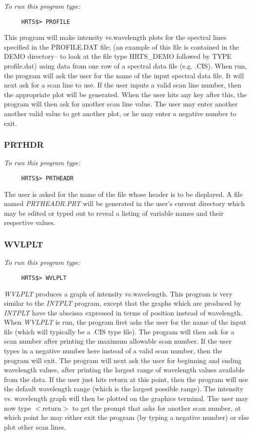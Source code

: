{\em To run this program type:}
\begin{verbatim}
     HRTS$> PROFILE
\end{verbatim}
  This program will make intensity vs.wavelength plots for the
  spectral lines specified in the  PROFILE.DAT file; (an example of
  this file is contained in the DEMO directory-- to look at the file type
  HRTS\_DEMO followed by TYPE profile.dat)
  using data from one row of a spectral data file (e.g. .CIS).  When
  run, the program will ask the user for the name of the input spectral
  data file.  It will next ask for a scan line to use.  If the user
  inputs a valid scan line number, then the appropriate plot will be
  generated.  When the user hits any key after this, the program will
  then ask for another scan line value.  The user may enter another
  another valid value to get another plot, or he may enter a negative
  number to exit.

\subsubsection{PRTHDR}

{\em To run this program type:}
\begin{verbatim}
     HRTS$> PRTHEADR
\end{verbatim}
  The user is asked for the name of the file whose header is to be
  displayed.  A file named {\em PRTHEADR.PRT} will be generated in the user's
  current directory which may be edited or typed out to reveal a listing
  of variable names and their respective values.

\subsubsection{WVLPLT}

{\em To run this program type:}
\begin{verbatim}
     HRTS$> WVLPLT
\end{verbatim}
{\em WVLPLT} produces a graph of intensity vs.wavelength.  This program
  is very similar to the {\em INTPLT} program, except that the graphs which are
  produced by {\em INTPLT} have the abscissa expressed in terms of position
  instead of wavelength.  When {\em WVLPLT} is run, the program first asks the
  user for the name of the input file (which will typically be a .CIS
  type file).   The program will then ask for a scan number after
  printing the maximum allowable scan number.  If the user types in a
  negative number here instead of a valid scan number, then the program
  will exit.  The program will next ask the user for beginning and ending
  wavelength values, after printing the largest range of wavelength
  values available from the data.  If the user just hits return at this
  point, then the program will use the default wavelength range (which is
  the largest possible range).  The intensity vs. wavelength graph will
  then be plotted on the graphics terminal.  The user may now type
  $<$return$>$ to get the prompt that asks for another
  scan number, at which point he may either exit the program (by typing a
  negative number) or else plot other scan lines.

